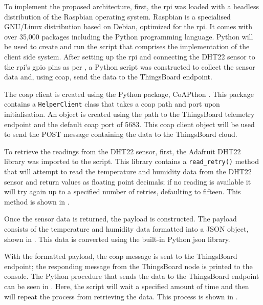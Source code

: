 To implement the proposed architecture, first, the \gls{rpi} was loaded with a 
headless distribution of the Raspbian \citep{raspbian_raspbian_2018} operating system. 
Raspbian is a specialised GNU/Linux distribution based on Debian, optimized for 
the \gls{rpi}. 
It comes with over 35,000 packages including the Python programming language. 
Python will be used to create and run the script that comprises the implementation
of the client side system.
After setting up the \gls{rpi} and connecting the DHT22 sensor to the \gls{rpi}'s
\gls{gpio} pins as per , a Python script was constructed
to collect the sensor data and, using \gls{coap}, send the data to the ThingsBoard
\citep{thingsboard_inc._thingsboard_2018} endpoint. 

The \gls{coap} client is created using the Python package, CoAPthon
\citep{tanganelli_coapthon3_2018}. 
This package contains a \texttt{HelperClient} class that takes a \gls{coap} 
path and port upon initialisation. 
An object is created using the path to the 
ThingsBoard telemetry endpoint and the default \gls{coap} port of 5683.
This \gls{coap} client object will be used to send the POST message containing
the data to the ThingsBoard cloud.

To retrieve the readings from the DHT22 sensor,
first, the Adafruit DHT22 library \citep{adafruit_adafruit_python_dht_2018} 
was imported to the script. This library contains a \texttt{read\_retry()} 
method that will attempt to read the temperature and humidity data from the 
DHT22 sensor and return values as floating point decimals; 
if no reading is available it will try again up to a specified number of retries,
defaulting to fifteen. This method is shown in .




Once the sensor data is returned, the payload is constructed. The payload 
consists of the temperature and humidity data formatted into a JSON object, 
shown in . This data is converted using the built-in
Python \gls{json} library. 

With the formatted payload, the \gls{coap} message is sent to the ThingsBoard
endpoint; the responding message from the ThingsBoard node is printed to the console.
The Python procedure that sends the data to the ThingsBoard endpoint can be seen 
in .
Here, the script will wait a specified amount of time and then will repeat the 
process from retrieving the data. This process is shown in 
. 

